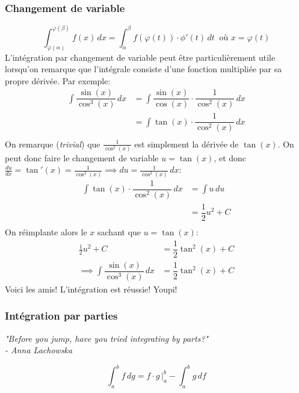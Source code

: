 \documentclass{article}
\begin{document}
\subsubsection{Changement de variable}
\begin{equation}
	\boxed{ \int_{\varphi(\alpha)}^{\varphi(\beta)} f(x) \, dx = \int_\alpha^\beta f(\varphi(t)) \cdot \phi'(t) \, dt } \: \text{ où } x= \varphi(t)
\end{equation}
L'intégration par changement de variable peut être particulièrement utile lorsqu'on remarque que l'intégrale consiste d'une fonction multipliée par sa propre dérivée. Par exemple: 
\begin{align*}
	\int \dfrac{\sin(x)}{\cos^3(x)} \, dx 	&= \int \dfrac{\sin(x)}{\cos(x)} \cdot \dfrac{1}{\cos^2(x)} \, dx \\
												&= \int \tan(x) \cdot \dfrac{1}{\cos^2(x)} \, dx \\
\end{align*}
On remarque (\emph{trivial}) que \(\frac{1}{\cos^2(x)}\) est simplement la dérivée de \(\tan(x)\). On peut donc faire le changement de variable \(u = \tan(x)\), et donc \(\frac{du}{dx} = \tan'(x) = \frac{1}{\cos^2(x)} \implies du = \frac{1}{\cos^2(x)} \, dx\):
\begin{align*}
	\int \tan(x) \cdot \dfrac{1}{\cos^2(x)} \, dx 	&= \int u \, du \\
															&= \dfrac{1}{2}u^2 + C \\
\end{align*}
On réimplante alors le \(x\) sachant que \(u = \tan(x)\):
\begin{align*}
	\frac12u^2 + C &= \dfrac{1}{2}\tan^2(x) + C \\
	\implies \int \dfrac{\sin(x)}{\cos^3(x)} \, dx &= \dfrac{1}{2}\tan^2(x) + C
\end{align*}
Voici les amis! L'intégration est réussie! Youpi! \\

\subsubsection{Intégration par parties}
\begin{center}
	\emph{"Before you jump, have you tried integrating by parts?" \\ \qquad \qquad - Anna Lachowska}
\end{center}
\begin{equation}
	\boxed{ \int_a^b f \, dg = f \cdot g \, \bigg|_a^b - \int_a^b g\, df }
\end{equation}
\end{document}
